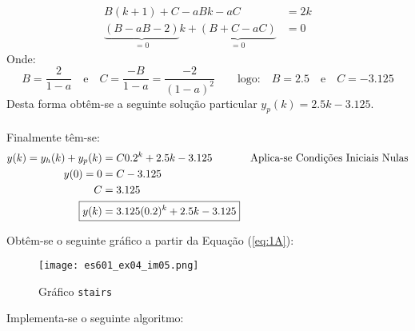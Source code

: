 \documentclass{article}
\begin{document}
\begin{resolution}
\begin{align}
                        B(k+1)  + C - aBk - aC    &= 2k\nonumber\\
                        \underbrace{(B-aB-2)}_{=0}k + \underbrace{(B+C-aC)}_{=0} &= 0\nonumber
                    \end{align}
                Onde:
                    \begin{equation*}
                        B=\frac{2}{1-a}
                        \quad\text{e}\quad
                        C=\frac{-B}{1-a}=\frac{-2}{(1-a)^2}
                        \qquad\text{logo:}\quad
                        \boxed{B=2.5}\quad\text{e}\quad\boxed{C=-3.125}
                    \end{equation*}
                Desta forma obtêm-se a seguinte solução particular $y_{p}(k) = 2.5k - 3.125$.
                \\\\
                Finalmente têm-se:
                    \begin{align}
                        y(k) = y_{h}(k) + y_{p}(k) &= C0.2^{k} + 2.5k - 3.125 & \text{Aplica-se Condições Iniciais Nulas}\nonumber\\
                        y(0) = 0 &= C - 3.125\nonumber\\
                        C &= 3.125\nonumber\\
                        \Aboxed{y(k) &= 3.125 (0.2)^{k} + 2.5k - 3.125}\label{eq:1A}
                    \end{align}
            \end{resolution}
            \begin{resolution}
                Obtêm-se o seguinte gráfico a partir da Equação (\ref{eq:1A}):
                \begin{figure}[H]
                    \centering
                    \texttt{[image: es601\_ex04\_im05.png]}
                    \caption{Gráfico \texttt{stairs}}
                \end{figure}
                Implementa-se o seguinte algoritmo:
                \begin{scriptsize}
                    \myOctave
                    
                \end{scriptsize}
            \end{resolution}
\newpage
\end{document}
